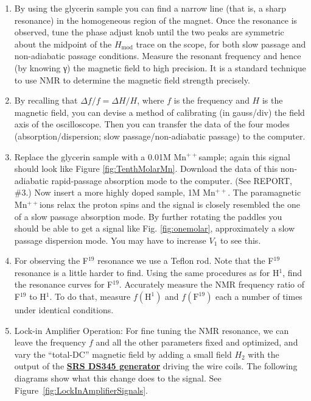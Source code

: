 \documentclass{../lab}
\begin{document}
\begin{enumerate}
    \item By using the glycerin sample you can find a narrow line (that is, a sharp resonance) in the homogeneous region of the magnet. Once the resonance is observed, tune the phase adjust knob until the two peaks are symmetric about the midpoint of the $H_\text{mod}$ trace on the scope, for both slow passage and non-adiabatic passage conditions. Measure the resonant frequency and hence (by knowing γ) the magnetic field to high precision. It is a standard technique to use NMR to determine the magnetic field strength precisely.

    \item By recalling that $\Delta f / f = \Delta H / H$, where $f$ is the frequency and $H$ is the magnetic field, you can devise a method of calibrating (in gauss/div) the field axis of the oscilloscope. Then you can transfer the data of the four modes (absorption/dispersion; slow passage/non-adiabatic passage) to the computer.
    
    \item Replace the glycerin sample with a 0.01M Mn$^{++}$sample; again this signal should look like Figure \ref{fig:TenthMolarMn}. Download the data of this non-adiabatic rapid-passage absorption mode to the computer. (See REPORT, \#3.) Now insert a more highly doped sample, 1M Mn$^{++}$. The paramagnetic Mn$^{++}$ions relax the proton spins and the signal is closely resembled the one of a slow passage absorption mode. By further rotating the paddles you should be able to get a signal like Fig. \ref{fig:onemolar}, approximately a slow passage dispersion mode. You may have to increase $V_1$ to see this.
    
    \item For observing the F$^{19}$ resonance we use a Teflon rod. Note that the F$^{19}$ resonance is a little harder to find. Using the same procedures as for H$^1$, find the resonance curves for F$^{19}$. Accurately measure the NMR frequency ratio of F$^{19}$ to H$^1$. To do that, measure $f(\text{H}^1)$ and $f(\text{F}^{19})$ each a number of times under identical conditions.
    
    \item Lock-in Amplifier Operation: For fine tuning the NMR resonance, we can leave the frequency $f$ and all the other parameters fixed and optimized, and vary the ``total-DC'' magnetic field by adding a small field $H_2$ with the output of the \href{https://youtu.be/PrM8DHFOFS0}{\textbf{SRS DS345 generator}} driving the wire coils. The following diagrams show what this change does to the signal. See Figure~\ref{fig:LockInAmplifierSignals}.
\end{enumerate}
\end{document}

